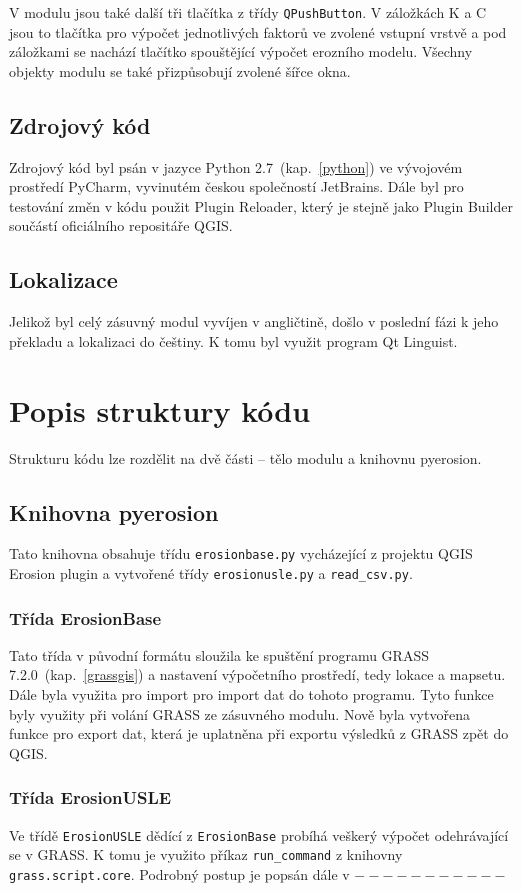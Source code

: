 V modulu jsou také další tři tlačítka z třídy \texttt{QPushButton}. V záložkách K a C jsou to tlačítka pro výpočet jednotlivých faktorů ve zvolené vstupní vrstvě a pod záložkami se nachází tlačítko spouštějící výpočet erozního modelu. Všechny objekty modulu se také přizpůsobují zvolené šířce okna.
\subsection{Zdrojový kód}
Zdrojový kód byl psán v jazyce Python 2.7~(kap.~\ref{python}) ve vývojovém prostředí PyCharm, vyvinutém českou společností JetBrains. Dále byl pro testování změn v kódu použit Plugin Reloader, který je stejně jako Plugin Builder součástí oficiálního repositáře QGIS.
\subsection{Lokalizace}
Jelikož byl celý zásuvný modul vyvíjen v angličtině, došlo v poslední fázi k jeho překladu a lokalizaci do češtiny. K tomu byl využit program Qt Linguist.

\section{Popis struktury kódu}
Strukturu kódu lze rozdělit na dvě části – tělo modulu a knihovnu pyerosion. 
\subsection{Knihovna pyerosion}
Tato knihovna obsahuje třídu \texttt{erosionbase.py} vycházející z projektu QGIS Erosion plugin\cite{erosiongithub} a vytvořené třídy \texttt{erosionusle.py} a \texttt{read\_csv.py}.
\subsubsection{Třída ErosionBase}
Tato třída v původní formátu sloužila ke spuštění programu GRASS 7.2.0~(kap.~\ref{grassgis}) a nastavení výpočetního prostředí, tedy lokace a mapsetu. Dále byla využita pro import pro import dat do tohoto programu. Tyto funkce byly využity při volání GRASS ze zásuvného modulu. Nově byla vytvořena funkce pro export dat, která je uplatněna při exportu výsledků z GRASS zpět do QGIS.
\subsubsection{Třída ErosionUSLE}
Ve třídě \texttt{ErosionUSLE} dědící z \texttt{ErosionBase} probíhá veškerý výpočet odehrávající se v GRASS. K tomu je využito příkaz \texttt{run\_command} z knihovny \texttt{grass.script.core}. Podrobný postup je popsán dále v $-----------$

